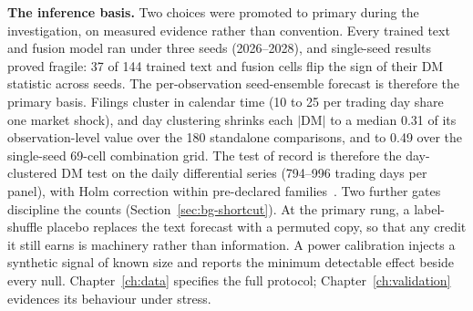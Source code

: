 \textbf{The inference basis.} Two choices were promoted to primary during the investigation, on measured evidence rather than convention. Every trained text and fusion model ran under three seeds (2026--2028), %
and single-seed results proved fragile: 37 of 144 trained text and fusion cells flip the sign of their DM statistic across seeds. %
The per-observation seed-ensemble forecast is therefore the primary basis. Filings cluster in calendar time (10 to 25 per trading day share one market shock), %
and day clustering shrinks each $|\mathrm{DM}|$ to a median 0.31 of its observation-level value over the 180 standalone comparisons, and to 0.49 over the single-seed 69-cell combination grid. %
The test of record is therefore the day-clustered DM test on the daily differential series (794--996 trading days per panel), %
with Holm correction within pre-declared families~\cite{holm1979simple}. Two further gates discipline the counts (Section~\ref{sec:bg-shortcut}). At the primary rung, a label-shuffle placebo replaces the text forecast with a permuted copy, so that any credit it still earns is machinery rather than information. A power calibration injects a synthetic signal of known size and reports the minimum detectable effect beside every null. Chapter~\ref{ch:data} specifies the full protocol; Chapter~\ref{ch:validation} evidences its behaviour under stress.
